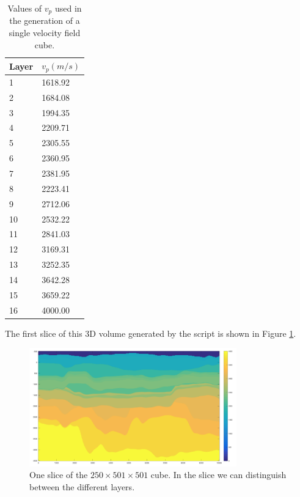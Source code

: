 \begin{table}[ht]
\begin{center}
    \begin{tabular}{|l|l|}
    \hline
    \textbf{Layer} & $v_{p}(m/s)$ \\ \hline
    1     & 1618.92 \\ \hline
    2     & 1684.08 \\ \hline
    3     & 1994.35 \\ \hline
    4     & 2209.71 \\ \hline
    5     & 2305.55 \\ \hline
    6     & 2360.95 \\ \hline
    7     & 2381.95 \\ \hline
    8     & 2223.41 \\ \hline
    9     & 2712.06 \\ \hline
    10    & 2532.22 \\ \hline
    11    & 2841.03 \\ \hline
    12    & 3169.31 \\ \hline
    13    & 3252.35 \\ \hline
    14    & 3642.28 \\ \hline
    15    & 3659.22 \\ \hline
    16    & 4000.00 \\ \hline
    \end{tabular}
    \caption {Values of $v_{p}$ used in the generation of a single velocity field cube.}
    \label{tab:valuesOfVp}
    \end{center}
\end{table}

The first slice of this 3D volume generated by the script is shown in Figure \ref{fig:slice1}.

\begin{figure}[ht]
    \centering
    \includegraphics[width=0.8\textwidth]{images/velocity_field.png}
    \caption{One slice of the $250\times501\times501$ cube. In the slice we can distinguish between the different layers.}
    \label{fig:slice1}
\end{figure}

